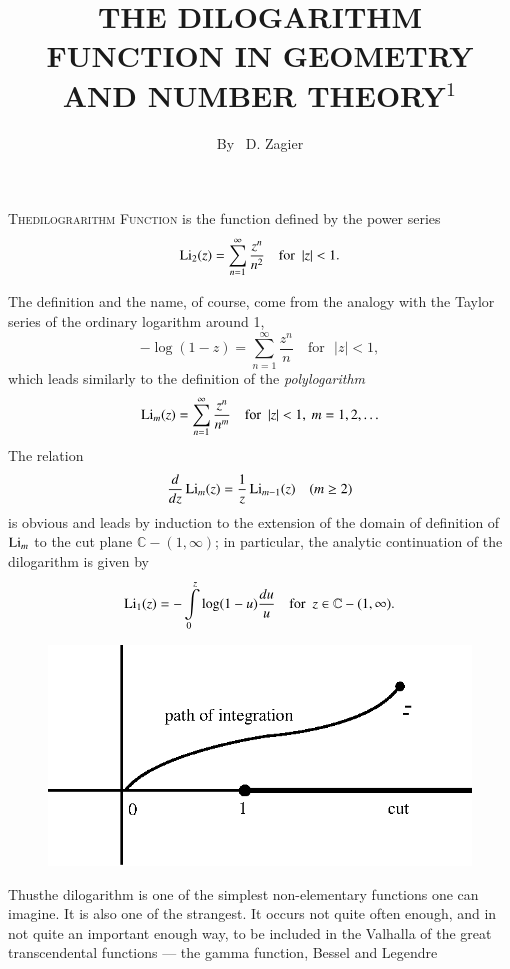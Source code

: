\title{THE DILOGARITHM FUNCTION IN GEOMETRY AND NUMBER THEORY$^{1}$}


\author{By~ D. Zagier}

\date{}
\maketitle

\setcounter{pageoriginal}{230}
\textsc{The\pageoriginale dilograrithm Function} is the function defined by the power series
$$
\operatorname{Li}_{2}(z)=\sum\limits_{n=1}^{\infty} \frac{z^{n}}{n^{2}}\quad\text{for~ } |z|<1.
$$

The definition and the name, of course, come from the analogy with the Taylor series of the ordinary logarithm around 1,
$$
-\log (1-z)=\sum\limits^{\infty}_{n=1}\frac{z^{n}}{n}\quad\text{for~ } |z|<1,
$$
which leads similarly to the definition of the {\em polylogarithm}
$$
\operatorname{Li}_{m}(z)=\sum\limits^{\infty}_{n=1}\frac{z^{n}}{n^{m}}\quad\text{for~ } |z|<1, \ m=1,2,\ldots
$$
The relation
$$
\frac{d}{dz}\operatorname{Li}_{m}(z)=\frac{1}{z}\operatorname{Li}_{m-1}(z)\quad (m\geq 2)
$$
is obvious and leads by induction to the extension of the domain of definition of $\operatorname{Li}_{m}$ to the cut plane $\mathbb{C}-(1,\infty)$; in particular, the analytic continuation of the dilogarithm is given by
$$
\operatorname{Li}_{1}(z)=-\int\limits^{z}_{0}\log (1-u)\frac{du}{u}\quad\text{for~ } z\in \mathbb{C}-(1,\infty).
$$
\begin{figure}[H]
\centering
\includegraphics[scale=.9]{figures/fig1.eps}
\end{figure}

Thus\pageoriginale the dilogarithm is one of the simplest non-elementary functions one can imagine. It is also one of the strangest. It occurs not quite often enough, and in not quite an important enough way, to be included in the Valhalla of the great transcendental functions --- the gamma function, Bessel and Legendre 
